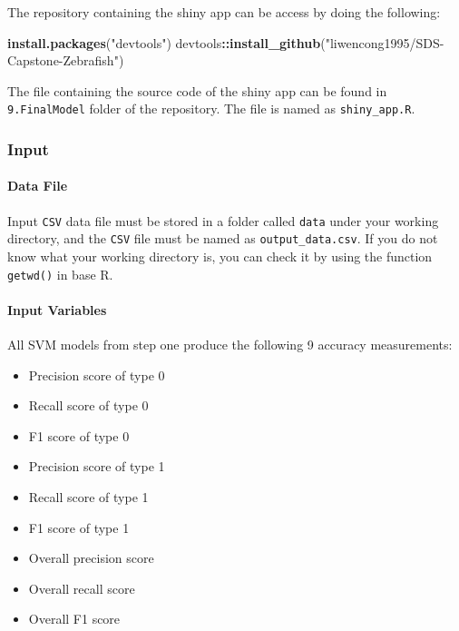 \documentclass[10pt,letterpaper]{article}
\newenvironment{Shaded}{\begin{snugshade}}{\end{snugshade}}
\newcommand{\KeywordTok}[1]{\textcolor[rgb]{0.13,0.29,0.53}{\textbf{#1}}}
\newcommand{\StringTok}[1]{\textcolor[rgb]{0.31,0.60,0.02}{#1}}
\newcommand{\OperatorTok}[1]{\textcolor[rgb]{0.81,0.36,0.00}{\textbf{#1}}}
\newcommand{\NormalTok}[1]{#1}
\providecommand{\tightlist}{%
  \setlength{\itemsep}{0pt}\setlength{\parskip}{0pt}}
\begin{document}
The repository containing the shiny app can be access by doing the
following:

\begin{Shaded}
\begin{Highlighting}[]
\KeywordTok{install.packages}\NormalTok{(}\StringTok{"devtools"}\NormalTok{)}
\NormalTok{devtools}\OperatorTok{::}\KeywordTok{install_github}\NormalTok{(}\StringTok{"liwencong1995/SDS-Capstone-Zebrafish"}\NormalTok{)}
\end{Highlighting}
\end{Shaded}

The file containing the source code of the shiny app can be found in
\texttt{9.FinalModel} folder of the repository. The file is named as
\texttt{shiny\_app.R}.

\subsubsection{Input}\label{input}

\paragraph{Data File}\label{data-file}

Input \texttt{CSV} data file must be stored in a folder called
\texttt{data} under your working directory, and the \texttt{CSV} file
must be named as \texttt{output\_data.csv}. If you do not know what your
working directory is, you can check it by using the function
\texttt{getwd()} in base R.

\paragraph{Input Variables}\label{input-variables}

All SVM models from step one produce the following 9 accuracy
measurements:

\begin{itemize}
\tightlist
\item
  Precision score of type 0
\item
  Recall score of type 0
\item
  F1 score of type 0
\item
  Precision score of type 1
\item
  Recall score of type 1
\item
  F1 score of type 1
\item
  Overall precision score
\item
  Overall recall score
\item
  Overall F1 score
\end{itemize}
\end{document}
